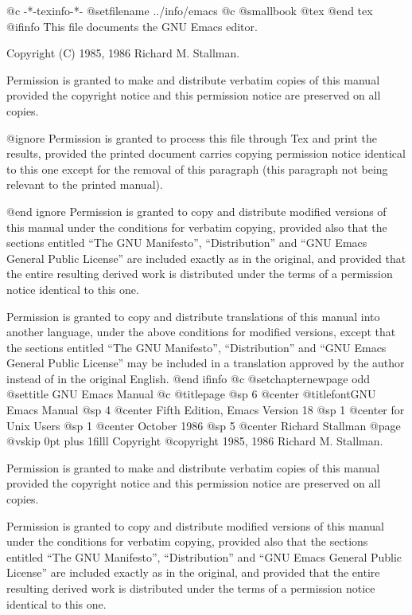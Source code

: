   @c -*-texinfo-*-
@setfilename ../info/emacs
@c @smallbook
@tex
\overfullrule=0pt
@end tex
@ifinfo
This file documents the GNU Emacs editor.

Copyright (C) 1985, 1986 Richard M. Stallman.

Permission is granted to make and distribute verbatim copies of
this manual provided the copyright notice and this permission notice
are preserved on all copies.

@ignore
Permission is granted to process this file through Tex and print the
results, provided the printed document carries copying permission
notice identical to this one except for the removal of this paragraph
(this paragraph not being relevant to the printed manual).

@end ignore
Permission is granted to copy and distribute modified versions of this
manual under the conditions for verbatim copying, provided also that the
sections entitled ``The GNU Manifesto'', ``Distribution'' and ``GNU Emacs
General Public License'' are included exactly as in the original, and
provided that the entire resulting derived work is distributed under the
terms of a permission notice identical to this one.

Permission is granted to copy and distribute translations of this manual
into another language, under the above conditions for modified versions,
except that the sections entitled ``The GNU Manifesto'', ``Distribution''
and ``GNU Emacs General Public License'' may be included in a translation
approved by the author instead of in the original English.
@end ifinfo
@c
@setchapternewpage odd
@settitle GNU Emacs Manual
@c
@titlepage
@sp 6
@center @titlefont{GNU Emacs Manual}
@sp 4
@center Fifth Edition, Emacs Version 18
@sp 1
@center for Unix Users
@sp 1
@center October 1986
@sp 5
@center Richard Stallman
@page
@vskip 0pt plus 1filll
Copyright @copyright{} 1985, 1986 Richard M. Stallman.

Permission is granted to make and distribute verbatim copies of
this manual provided the copyright notice and this permission notice
are preserved on all copies.

Permission is granted to copy and distribute modified versions of this
manual under the conditions for verbatim copying, provided also that the
sections entitled ``The GNU Manifesto'', ``Distribution'' and ``GNU Emacs
General Public License'' are included exactly as in the original, and
provided that the entire resulting derived work is distributed under the
terms of a permission notice identical to this one.

